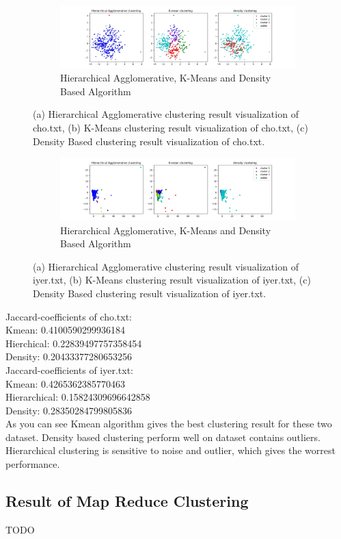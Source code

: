 \documentclass[fleqn]{llncs}
\begin{document}
\begin{figure}
	\centering
	\begin{subfigure}{1\textwidth}
		\centering\includegraphics[width=1\textwidth]{all_three.jpg}
		\caption{Hierarchical Agglomerative, K-Means and Density Based Algorithm}
	\end{subfigure}
	\caption{(a) Hierarchical Agglomerative clustering result visualization of cho.txt, (b) K-Means clustering result visualization of cho.txt, (c) Density Based clustering result visualization of cho.txt.}
	\label{fig2}
\end{figure}
\begin{figure}
	\centering
	\begin{subfigure}{1\textwidth}
		\centering\includegraphics[width=1\textwidth]{all_threeiyer.jpg}
		\caption{Hierarchical Agglomerative, K-Means and Density Based Algorithm}
	\end{subfigure}
	\caption{(a) Hierarchical Agglomerative clustering result visualization of iyer.txt, (b) K-Means clustering result visualization of iyer.txt, (c) Density Based clustering result visualization of iyer.txt.}
	\label{fig3}
\end{figure}
Jaccard-coefficients of cho.txt:\\
Kmean: 0.4100590299936184\\ 
Hierchical: 0.22839497757358454\\
Density: 0.20433377280653256\\

Jaccard-coefficients of iyer.txt:\\
Kmean: 0.4265362385770463\\ 
Hierarchical: 0.15824309696642858\\
Density: 0.28350284799805836\\

As you can see Kmean algorithm gives the best clustering result for these two dataset. Density based clustering perform well on dataset contains outliers. Hierarchical clustering is sensitive to noise and 
outlier, which gives the worrest performance.

\subsection{Result of Map Reduce Clustering}


TODO
\end{document}
